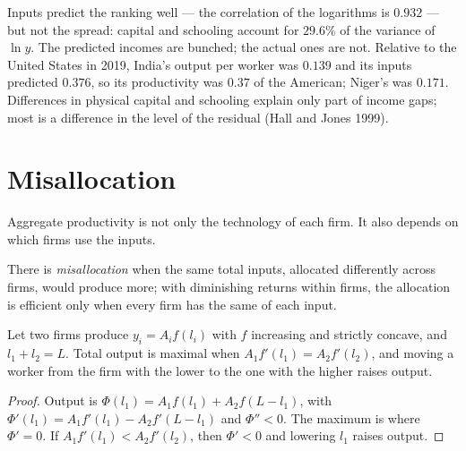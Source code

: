 Inputs predict the ranking well --- the correlation of the logarithms is
$0.932$ --- but not the spread: capital and schooling account for $29.6\%$ of the
variance of $\ln y$. %
The predicted incomes are bunched; the actual ones are not. Relative to the
United States in 2019, India's output per worker was $0.139$ and its inputs
predicted $0.376$, so its productivity was $0.37$ of the American; Niger's
was $0.171$. %
Differences in physical capital and schooling explain only part of income
gaps; most is a difference in the level of the residual (Hall and Jones
1999). %

\section{Misallocation}\label{sec:b1:growth-accounting:misallocation}

Aggregate productivity is not only the technology of each firm. It also
depends on which firms use the inputs.

\begin{definition}[Misallocation]\label{def:b1:growth-accounting:misallocation}
There is \emph{misallocation} when the same total inputs, allocated
differently across firms, would produce more; with diminishing returns
within firms, the allocation is efficient only when every firm has the
same  of each input.
\end{definition}

\begin{proposition}\label{prop:b1:growth-accounting:equal-mp}
Let two firms produce $y_i = A_i f(l_i)$ with $f$ increasing and strictly
concave, and $l_1 + l_2 = L$. Total output is maximal when $A_1 f'(l_1) = A_2 f'(l_2)$, and
moving a worker from the firm with the lower  to the one
with the higher raises output.
\end{proposition}

\begin{proof}
Output is $\Phi(l_1) = A_1 f(l_1) + A_2 f(L - l_1)$, with $\Phi'(l_1) = A_1 f'(l_1) - A_2 f'(L - l_1)$ and $\Phi'' < 0$.
The maximum is where $\Phi' = 0$. If $A_1 f'(l_1) < A_2 f'(l_2)$, then $\Phi' < 0$ and lowering $l_1$ raises
output.
\end{proof}

